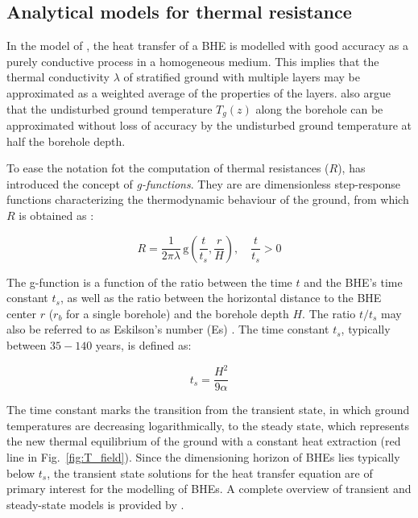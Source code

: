 \subsection{Analytical models for thermal resistance}
\label{geo_models}
\label{app:models}

In the model of \citet{claesson_conductive_1988}, the heat transfer of a BHE is modelled with good accuracy as a purely conductive process in a homogeneous medium.
This implies that the thermal conductivity $\lambda$ of stratified ground with multiple layers may be approximated as a weighted average of the properties of the layers. 
\citet{claesson_conductive_1988} also argue that the undisturbed ground temperature $T_g(z)$ along the borehole can be approximated without loss of accuracy by the undisturbed ground temperature at half the borehole depth. 

To ease the notation fot the computation of thermal resistances ($R$), \citet{eskilson_thermal_1987} has introduced the concept of \textit{g-functions}. They are are dimensionless step-response functions characterizing the thermodynamic behaviour of the ground, from which $R$ is obtained as \cite{eskilson_thermal_1987}:

\begin{equation}
    R = \frac{1}{2 \pi \lambda} \, \mathrm{g}\left( \frac{t}{t_s}, \frac{r}{H} \right), \quad \frac{t}{t_s} > 0
\end{equation}

The g-function is a function of the ratio between the time $t$ and the BHE's time constant $t_s$, as well as the ratio between the horizontal distance to the BHE center $r$ ($r_b$ for a single borehole) and the borehole depth $H$. The ratio $t/t_s$ may also be referred to as Eskilson's number (Es) \citep{pahud_geothermal_2002}. 
The time constant $t_s$, typically between $35-140$ years, is defined as:

\begin{equation}
    t_s = \frac{H^2}{9 \alpha}
\end{equation}

The time constant marks the transition from the transient state, in which ground temperatures are decreasing logarithmically, to the steady state, which represents the new thermal equilibrium of the ground with a constant heat extraction (red line in Fig.~\ref{fig:T_field}).
Since the dimensioning horizon of BHEs lies typically below $t_s$, the transient state solutions for the heat transfer equation are of primary interest for the modelling of BHEs. A complete overview of transient and steady-state models is provided by \citet{pahud_geothermal_2002}.

